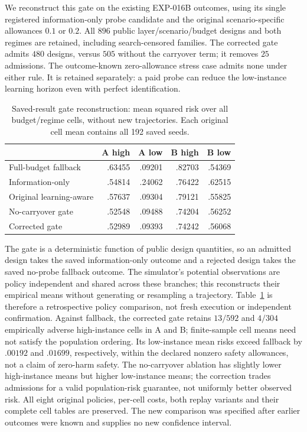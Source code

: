 \documentclass[journal]{IEEEtran}
\begin{document}
We reconstruct this gate on the existing EXP-016B outcomes, using its single registered information-only probe candidate and the original scenario-specific allowances $0.1$ or $0.2$.
All $896$ public layer/scenario/budget designs and both regimes are retained, including search-censored families.
The corrected gate admits $480$ designs, versus $505$ without the carryover term; it removes $25$ admissions.
The outcome-known zero-allowance stress case admits none under either rule.
It is retained separately: a paid probe can reduce the low-instance learning horizon even with perfect identification.

\begin{table}[t]
\centering
\caption{Saved-result gate reconstruction: mean squared risk over all budget/regime cells, without new trajectories. Each original cell mean contains all 192 saved seeds.}
\label{tab:gate-reconstruction}
\begin{tabular}{lrrrr}
\toprule
& A high & A low & B high & B low\\
\midrule
Full-budget fallback & .63455 & .09201 & .82703 & .54369\\
Information-only & .54814 & .24062 & .76422 & .62515\\
Original learning-aware & .57637 & .09304 & .79121 & .55825\\
No-carryover gate & .52548 & .09488 & .74204 & .56252\\
Corrected gate & .52989 & .09393 & .74242 & .56068\\
\bottomrule
\end{tabular}
\end{table}

The gate is a deterministic function of public design quantities, so an admitted design takes the saved information-only outcome and a rejected design takes the saved no-probe fallback outcome.
The simulator's potential observations are policy independent and shared across these branches; this reconstructs their empirical means without generating or resampling a trajectory.
Table~\ref{tab:gate-reconstruction} is therefore a retrospective policy comparison, not fresh execution or independent confirmation.
Against fallback, the corrected gate retains $13/592$ and $4/304$ empirically adverse high-instance cells in A and B; finite-sample cell means need not satisfy the population ordering.
Its low-instance mean risks exceed fallback by $.00192$ and $.01699$, respectively, within the declared nonzero safety allowances, not a claim of zero-harm safety.
The no-carryover ablation has slightly lower high-instance means but higher low-instance means; the correction trades admissions for a valid population-risk guarantee, not uniformly better observed risk.
All eight original policies, per-cell costs, both replay variants and their complete cell tables are preserved.
The new comparison was specified after earlier outcomes were known and supplies no new confidence interval.
\end{document}
